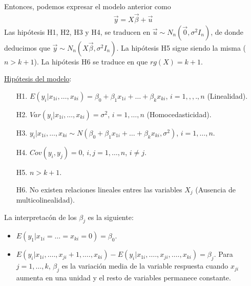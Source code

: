 Entonces, podemos expresar el modelo anterior como
\begin{align*}
    \vec{y} = X \vec{\beta} + \vec{u}
\end{align*}
Las hipótesis H1, H2, H3 y H4, se traducen en $\vec{u} \sim N_n(\vec{0}, \sigma^2 I_n)$, de donde deducimos que $\vec{y} \sim N_n(X\vec{\beta}, \sigma^2 I_n)$. La hipótesis H5 sigue siendo la misma ($n > k+1$). La hipótesis H6 se traduce en que $rg(X) = k+1$.

\underline{Hipótesis del modelo}:
\begin{enumerate}
    \item[H1.] $E(y_i | x_{1i},\ldots,x_{ki}) = \beta_0 + \beta_1 x_{1i} + \ldots + \beta_k x_{ki}$, $i = 1,,,.,n$ (Linealidad).
    \item[H2.] $Var(y_i | x_{1i},\ldots,x_{ki}) = \sigma^2$, $i = 1,\ldots,n$ (Homocedasticidad).
    \item[H3.] $y_i | x_{1i},\ldots,x_{ki} \sim N(\beta_0 + \beta_1 x_{1i} + \ldots + \beta_k x_{ki}, \sigma^2)$, $i = 1,\ldots,n$.
    \item[H4.] $Cov(y_i,y_j) = 0$, $i,j = 1,\ldots,n$, $i \not = j$.
    \item[H5.] $n > k+1$.
    \item[H6.] No existen relaciones lineales entres las variables $X_j$ (Ausencia de multicolinealidad).
\end{enumerate}
La interpretacón de los $\beta_j$ es la siguiente:
\begin{itemize}
    \item $E(y_1 | x_{1i} = \ldots = x_{ki} = 0) = \beta_0$.
    \item $E(y_i | x_{1i}, \ldots., x_{ji} +1, \ldots., x_{ki}) - E(y_i | x_{1i}, \ldots., x_{ji}, \ldots., x_{ki}) = \beta_j$. Para $j=1,\ldots,k$, $\beta_j$ es la variación media de la variable respuesta cuando $x_{ji}$ aumenta en una unidad y el resto de variables permanece constante.
\end{itemize}

